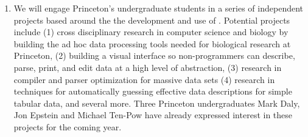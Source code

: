 \documentclass[11pt]{article}
\begin{document}
\begin{enumerate}
\item We will engage Princeton's undergraduate students in 
a series of independent projects based around the the development and use of
\datatype.  Potential projects include (1) cross disciplinary
research in computer science and biology by building the ad hoc
data processing tools needed for biological research at 
Princeton, (2) building a visual interface so non-programmers can
describe, parse, print, and edit data at a high level of abstraction,
(3) research in compiler and parser optimization for massive data sets 
(4) research in techniques for automatically guessing effective data 
descriptions for simple tabular data, and several more.  Three
Princeton undergraduates Mark Daly, Jon Epstein and Michael Ten-Pow
have already expressed interest in these projects for the coming year.
\end{enumerate}


\end{document}
